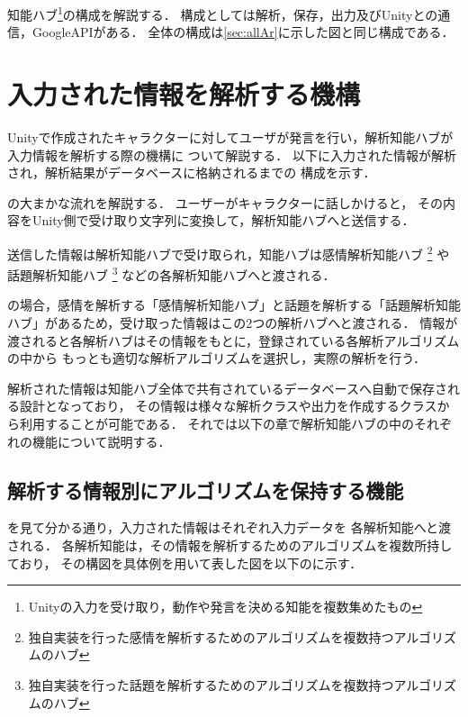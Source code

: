 知能ハブ\footnote{Unityの入力を受け取り，動作や発言を決める知能を複数集めたもの}の構成を解説する．
構成としては解析，保存，出力及びUnityとの通信，GoogleAPIがある．
全体の構成は\ref{sec:allAr}に示した図と同じ構成である．

\section{入力された情報を解析する機構}
Unityで作成されたキャラクターに対してユーザが発言を行い，解析知能ハブが入力情報を解析する際の機構に
ついて解説する．
以下に入力された情報が解析され，解析結果がデータベースに格納されるまでの
構成を示す．


の大まかな流れを解説する．
ユーザーがキャラクターに話しかけると，
その内容をUnity側で受け取り文字列に変換して，解析知能ハブへと送信する．

送信した情報は解析知能ハブで受け取られ，知能ハブは感情解析知能ハブ
\footnote{独自実装を行った感情を解析するためのアルゴリズムを複数持つアルゴリズムのハブ}
や話題解析知能ハブ
\footnote{独自実装を行った話題を解析するためのアルゴリズムを複数持つアルゴリズムのハブ}
などの各解析知能ハブへと渡される．

の場合，感情を解析する「感情解析知能ハブ」と話題を解析する「話題解析知能
ハブ」があるため，受け取った情報はこの2つの解析ハブへと渡される．
情報が渡されると各解析ハブはその情報をもとに，登録されている各解析アルゴリズムの中から
もっとも適切な解析アルゴリズムを選択し，実際の解析を行う．

解析された情報は知能ハブ全体で共有されているデータベースへ自動で保存される設計となっており，
その情報は様々な解析クラスや出力を作成するクラスから利用することが可能である．
それでは以下の章で解析知能ハブの中のそれぞれの機能について説明する．

\subsection{解析する情報別にアルゴリズムを保持する機能}
を見て分かる通り，入力された情報はそれぞれ入力データを
各解析知能へと渡される．
各解析知能は，その情報を解析するためのアルゴリズムを複数所持しており，
その構図を具体例を用いて表した図を以下のに示す．

